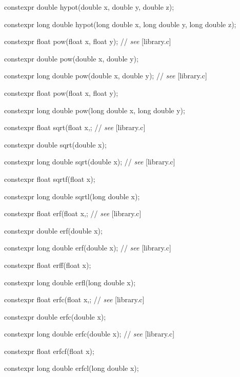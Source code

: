 \documentclass[prd,twocolumn,amsmath,amssymb,nofootinbib,eqsecnum]{revtex4-1}
\newcommand{\highlight}[1]{{\color{red} #1}}
\newcommand{\stdcomment}[1]{{// {\em see} [#1]}}
\begin{document}
{\highlight{constexpr} double hypot(double x, double y, double z);

\highlight{constexpr} long double hypot(long double x, long double y, long double z);


\highlight{constexpr} float pow(float x, float y); \stdcomment{library.c}

\highlight{constexpr} double pow(double x, double y);

\highlight{constexpr} long double pow(double x, double y); \stdcomment{library.c}

\highlight{constexpr} float pow(float x, float y);

\highlight{constexpr} long double pow(long double x, long double y);

\vspace{2ex}


\highlight{constexpr} float sqrt(float x,; \stdcomment{library.c}

\highlight{constexpr} double sqrt(double x);

\highlight{constexpr} long double sqrt(double x); \stdcomment{library.c}

\highlight{constexpr} float sqrtf(float x);

\highlight{constexpr} long double sqrtl(long double x);

\vspace{2ex}


\highlight{constexpr} float erf(float x,; \stdcomment{library.c}

\highlight{constexpr} double erf(double x);

\highlight{constexpr} long double erf(double x); \stdcomment{library.c}

\highlight{constexpr} float erff(float x);

\highlight{constexpr} long double erfl(long double x);

\vspace{2ex}

\highlight{constexpr} float erfc(float x,; \stdcomment{library.c}

\highlight{constexpr} double erfc(double x);

\highlight{constexpr} long double erfc(double x); \stdcomment{library.c}

\highlight{constexpr} float erfcf(float x);

\highlight{constexpr} long double erfcl(long double x);

}
\end{document}
